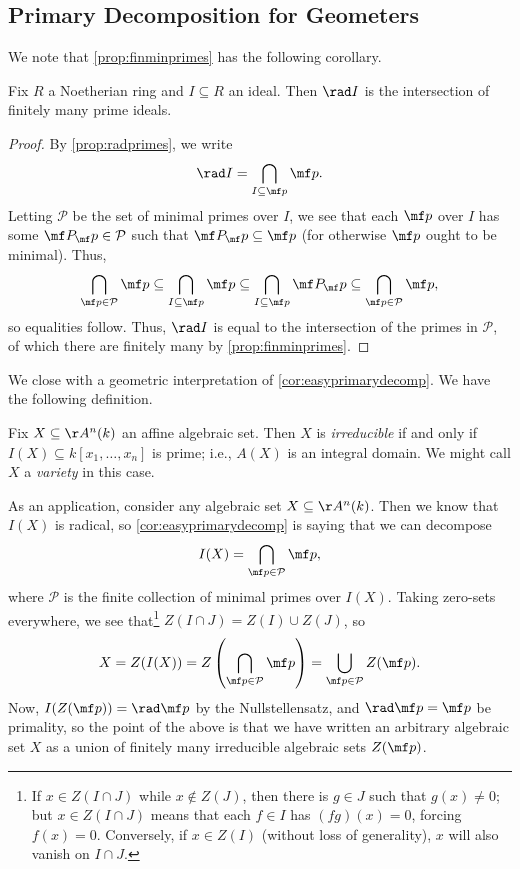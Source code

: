 \subsection{Primary Decomposition for Geometers}
We note that \autoref{prop:finminprimes} has the following corollary.
\begin{corollary} \label{cor:easyprimarydecomp}
	Fix $R$ a Noetherian ring and $I\subseteq R$ an ideal. Then $\rad I$ is the intersection of finitely many prime ideals.
\end{corollary}
\begin{proof}
	By \autoref{prop:radprimes}, we write
	\[\rad I=\bigcap_{I\subseteq\mf p}\mf p.\]
	Letting $\mathcal P$ be the set of minimal primes over $I$, we see that each $\mf p$ over $I$ has some $\mf P_\mf p\in\mathcal P$ such that $\mf P_\mf p\subseteq\mf p$ (for otherwise $\mf p$ ought to be minimal). Thus,
	\[\bigcap_{\mf p\in\mathcal P}\mf p\subseteq\bigcap_{I\subseteq\mf p}\mf p\subseteq\bigcap_{I\subseteq\mf p}\mf P_\mf p\subseteq\bigcap_{\mf p\in\mathcal P}\mf p,\]
	so equalities follow. Thus, $\rad I$ is equal to the intersection of the primes in $\mathcal P$, of which there are finitely many by \autoref{prop:finminprimes}.
\end{proof}
We close with a geometric interpretation of \autoref{cor:easyprimarydecomp}. We have the following definition.
\begin{defi}[Irreducible]
	Fix $X\subseteq\AA^n(k)$ an affine algebraic set. Then $X$ is \textit{irreducible} if and only if $I(X)\subseteq k[x_1,\ldots,x_n]$ is prime; i.e., $A(X)$ is an integral domain. We might call $X$ a \textit{variety} in this case.
\end{defi}
As an application, consider any algebraic set $X\subseteq\AA^n(k)$. Then we know that $I(X)$ is radical, so \autoref{cor:easyprimarydecomp} is saying that we can decompose
\[I(X)=\bigcap_{\mf p\in\mathcal P}\mf p,\]
where $\mathcal P$ is the finite collection of minimal primes over $I(X)$. Taking zero-sets everywhere, we see that\footnote{If $x\in Z(I\cap J)$ while $x\notin Z(J)$, then there is $g\in J$ such that $g(x)\ne0$; but $x\in Z(I\cap J)$ means that each $f\in I$ has $(fg)(x)=0$, forcing $f(x)=0$. Conversely, if $x\in Z(I)$ (without loss of generality), $x$ will also vanish on $I\cap J$.} $Z(I\cap J)=Z(I)\cup Z(J)$, so
\[X=Z(I(X))=Z\left(\bigcap_{\mf p\in\mathcal P}\mf p\right)=\bigcup_{\mf p\in\mathcal P}Z(\mf p).\]
Now, $I(Z(\mf p))=\rad\mf p$ by the Nullstellensatz, and $\rad\mf p=\mf p$ be primality, so the point of the above is that we have written an arbitrary algebraic set $X$ as a union of finitely many irreducible algebraic sets $Z(\mf p)$.
